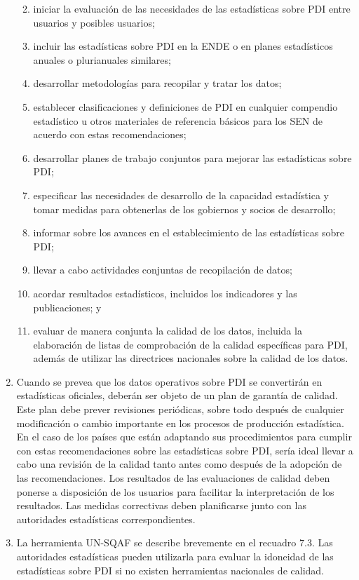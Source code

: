 \documentclass[
]{book}
\providecommand{\tightlist}{%
  \setlength{\itemsep}{0pt}\setlength{\parskip}{0pt}}
\begin{document}
\begin{enumerate}
  \begin{enumerate}
  \def\labelenumii{\arabic{enumii}.}
  \tightlist
  \item
    iniciar la evaluación de las necesidades de las estadísticas sobre PDI entre usuarios y posibles usuarios;
  \item
    incluir las estadísticas sobre PDI en la ENDE o en planes estadísticos anuales o plurianuales similares;
  \item
    desarrollar metodologías para recopilar y tratar los datos;
  \item
    establecer clasificaciones y definiciones de PDI en cualquier compendio estadístico u otros materiales de referencia básicos para los SEN de acuerdo con estas recomendaciones;
  \item
    desarrollar planes de trabajo conjuntos para mejorar las estadísticas sobre PDI;
  \item
    especificar las necesidades de desarrollo de la capacidad estadística y tomar medidas para obtenerlas de los gobiernos y socios de desarrollo;
  \item
    informar sobre los avances en el establecimiento de las estadísticas sobre PDI;
  \item
    llevar a cabo actividades conjuntas de recopilación de datos;
  \item
    acordar resultados estadísticos, incluidos los indicadores y las publicaciones; y
  \item
    evaluar de manera conjunta la calidad de los datos, incluida la elaboración de listas de comprobación de la calidad específicas para PDI, además de utilizar las directrices nacionales sobre la calidad de los datos.
  \end{enumerate}
\item
  Cuando se prevea que los datos operativos sobre PDI se convertirán en estadísticas oficiales, deberán ser objeto de un plan de garantía de calidad. Este plan debe prever revisiones periódicas, sobre todo después de cualquier modificación o cambio importante en los procesos de producción estadística. En el caso de los países que están adaptando sus procedimientos para cumplir con estas recomendaciones sobre las estadísticas sobre PDI, sería ideal llevar a cabo una revisión de la calidad tanto antes como después de la adopción de las recomendaciones. Los resultados de las evaluaciones de calidad deben ponerse a disposición de los usuarios para facilitar la interpretación de los resultados. Las medidas correctivas deben planificarse junto con las autoridades estadísticas correspondientes.
\item
  La herramienta UN-SQAF se describe brevemente en el recuadro 7.3. Las autoridades estadísticas pueden utilizarla para evaluar la idoneidad de las estadísticas sobre PDI si no existen herramientas nacionales de calidad.
\end{enumerate}
\end{document}
